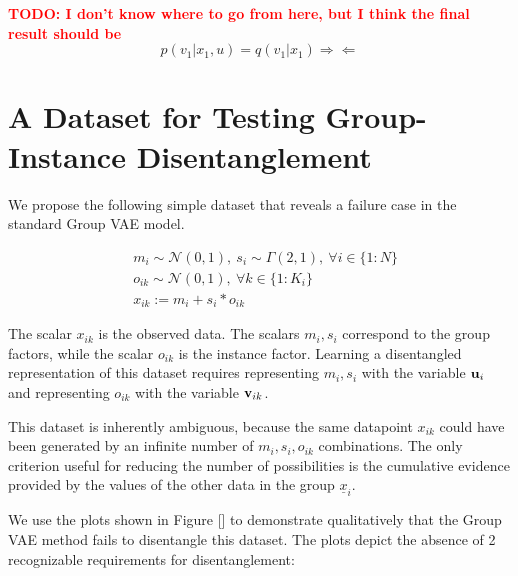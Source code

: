 \documentclass{article}
\newcommand{\todo}[1]{\textcolor{red}{\textbf{TODO: #1}}}
\begin{document}
\todo{I don't know where to go from here, but I think the final result should be} $$p(v_1|x_1,u) = q(v_1|x_1) \Rightarrow\!\Leftarrow$$


\section{A Dataset for Testing Group-Instance Disentanglement}

We propose the following simple dataset that reveals a failure case in the standard Group VAE model.

\begin{align}
    & m_i \sim \mathcal{N}(0, 1), ~ s_i \sim \Gamma(2, 1), ~ \forall i \in \{1:N\} \\
    & o_{ik} \sim \mathcal{N}(0, 1), ~ \forall k \in \{1:K_i\} \\
    & x_{ik} := m_i + s_i * o_{ik}
\end{align}

The scalar $x_{ik}$ is the observed data. The scalars $m_i, s_i$ correspond to the group factors, while the scalar $o_{ik}$ is the instance factor. Learning a disentangled representation of this dataset requires representing $m_i, s_i$ with the variable ${\mathbf{u}}_i$ and representing $o_{ik}$ with the variable ${\mathbf{v}}_{ik}$.

This dataset is inherently ambiguous, because the same datapoint $x_{ik}$ could have been generated by an infinite number of $m_i, s_i, o_{ik}$ combinations. The only criterion useful for reducing the number of possibilities is the cumulative evidence provided by the values of the other data in the group $\underline{x}_i$.

We use the plots shown in Figure [] to demonstrate qualitatively that the Group VAE method fails to disentangle this dataset. The plots depict the absence of 2 recognizable requirements for disentanglement:
\end{document}
